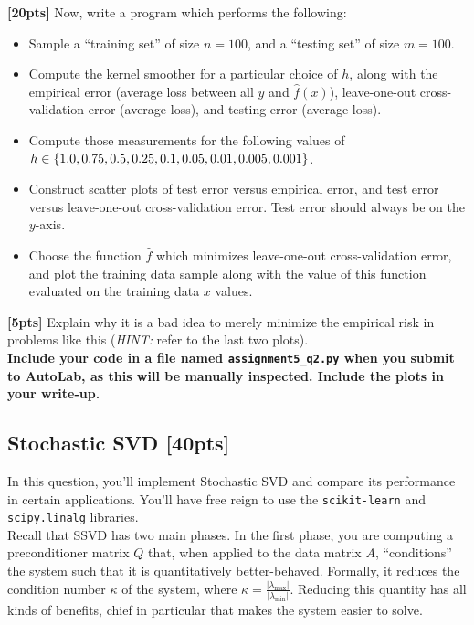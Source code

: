 \documentclass[paper=a4, fontsize=11pt]{scrartcl} %
\numberwithin{figure}{section} %
\numberwithin{table}{section} %
\begin{document}
\textbf{[20pts]} Now, write a program which performs the following:
\begin{itemize}
	\item Sample a ``training set'' of size $n = 100$, and a ``testing set'' of size $m = 100$.
	\item Compute the kernel smoother for a particular choice of $h$, along with the empirical error (average loss between all $y$ and $\hat{f}(x)$), leave-one-out cross-validation error (average loss), and testing error (average loss).
	\item Compute those measurements for the following values of $h \in \\ \{1.0, 0.75, 0.5, 0.25, 0.1, 0.05, 0.01, 0.005, 0.001 \}$.
	\item Construct scatter plots of test error versus empirical error, and test error versus leave-one-out cross-validation error. Test error should always be on the $y$-axis.
	\item Choose the function $\hat{f}$ which minimizes leave-one-out cross-validation error, and plot the training data sample along with the value of this function evaluated on the training data $x$ values.
\end{itemize}

\textbf{[5pts]} Explain why it is a bad idea to merely minimize the empirical risk in problems like this (\emph{HINT:} refer to the last two plots). \\

\textbf{Include your code in a file named \texttt{assignment5\_q2.py} when you submit to AutoLab, as this will be manually inspected. Include the plots in your write-up.}

\subsection{Stochastic SVD \textbf{[40pts]}}

In this question, you'll implement Stochastic SVD and compare its performance in certain applications. You'll have free reign to use the \texttt{scikit-learn} and \texttt{scipy.linalg} libraries. \\

Recall that SSVD has two main phases. In the first phase, you are computing a preconditioner matrix $Q$ that, when applied to the data matrix $A$, ``conditions'' the system such that it is quantitatively better-behaved. Formally, it reduces the condition number $\kappa$ of the system, where $\kappa = \frac{|\lambda_{\max}|}{|\lambda_{\min}|}$. Reducing this quantity has all kinds of benefits, chief in particular that makes the system easier to solve. \\
\end{document}
